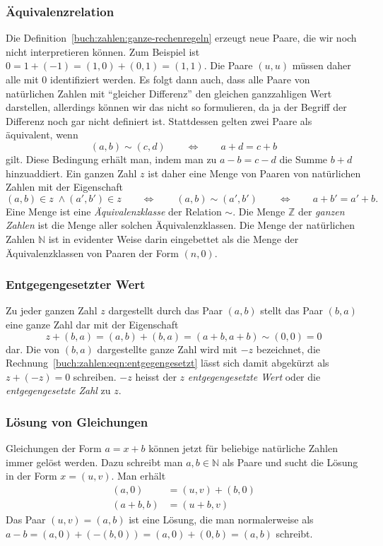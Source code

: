 \subsubsection{Äquivalenzrelation}
Die Definition~\eqref{buch:zahlen:ganze-rechenregeln}
erzeugt neue Paare, die wir noch nicht interpretieren können.
Zum Beispiel ist $0=1+(-1) = (1,0) + (0,1) = (1,1)$.
Die Paare $(u,u)$ müssen daher alle mit $0$ identifiziert werden.
Es folgt dann auch, dass alle Paare von natürlichen Zahlen mit 
``gleicher Differenz'' den gleichen ganzzahligen Wert darstellen,
allerdings können wir das nicht so formulieren, da ja der Begriff
der Differenz noch gar nicht definiert ist.
Stattdessen gelten zwei Paare als äquivalent, wenn
\begin{equation}
(a,b) \sim (c,d)
\qquad\Leftrightarrow\qquad
a+d = c+b
\label{buch:zahlen:ganz-aquivalenz}
\end{equation}
gilt.
Diese Bedingung erhält man, indem man zu $a-b=c-d$ die Summe $b+d$ 
hinzuaddiert.
Ein ganzen Zahl $z$ ist daher eine Menge von Paaren von natürlichen
Zahlen mit der Eigenschaft
\[
(a,b)\in z\;\wedge (a',b')\in z
\qquad\Leftrightarrow\qquad
(a,b)\sim(a',b')
\qquad\Leftrightarrow\qquad
a+b' = a'+b.
\]
Eine Menge ist eine {\em Äquivalenzklasse} der Relation $\sim$.
Die Menge $\mathbb{Z}$ der {\em ganzen Zahlen} ist die Menge aller solchen
%
Äquivalenzklassen.
Die Menge der natürlichen Zahlen $\mathbb{N}$ ist in evidenter Weise
darin eingebettet als die Menge der Äquivalenzklassen von Paaren der
Form $(n,0)$.

\subsubsection{Entgegengesetzter Wert}
Zu jeder ganzen Zahl $z$ dargestellt durch das Paar $(a,b)$ 
stellt das Paar $(b,a)$ eine ganze Zahl dar mit der Eigenschaft
\begin{equation}
z+(b,a)
=
(a,b) + (b,a) = (a+b,a+b) \sim (0,0) = 0
\label{buch:zahlen:eqn:entgegengesetzt}
\end{equation}
dar.
Die von $(b,a)$ dargestellte ganze Zahl wird mit $-z$ bezeichnet,
die Rechnung~\eqref{buch:zahlen:eqn:entgegengesetzt} lässt sich damit
abgekürzt als $z+(-z)=0$ schreiben.
$-z$ heisst der $z$ {\em entgegengesetzte Wert} oder die
%
{\em entgegengesetzte Zahl} zu $z$.

\subsubsection{Lösung von Gleichungen}
Gleichungen der Form $a=x+b$ können jetzt für beliebige natürliche Zahlen
immer gelöst werden.
Dazu schreibt man $a,b\in\mathbb{N}$ als Paare und sucht die
Lösung in der Form $x=(u,v)$.
Man erhält
\begin{align*}
(a,0) &= (u,v) + (b,0)
\\
(a+b,b) &= (u+b,v)
\end{align*}
Das Paar $(u,v) = (a,b)$ ist eine Lösung, die man normalerweise als
$a-b = (a,0) + (-(b,0)) = (a,0) + (0,b) = (a,b)$ schreibt.

